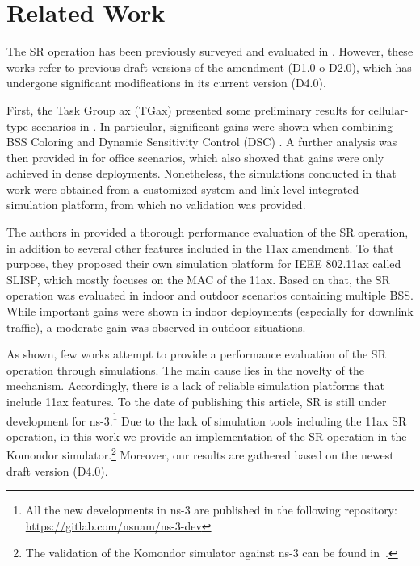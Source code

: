 \documentclass[conference]{IEEEtran}
\begin{document}
	\section{Related Work}
	\label{section:related_work}
	
	The SR operation has been previously surveyed and evaluated in \cite{bellalta2016ieee,khorov2018tutorial,sr_evaluation_1,sr_evaluation_3,sr_evaluation_2}. However, these works refer to previous draft versions of the amendment (D1.0 o D2.0), which has undergone significant modifications in its current version (D4.0).

	First, the Task Group ax (TGax) presented some preliminary results for cellular-type scenarios in \cite{sr_evaluation_1}. In particular, significant gains were shown when combining BSS Coloring and Dynamic Sensitivity Control (DSC) \cite{smith2017dynamic}. A further analysis was then provided in \cite{sr_evaluation_3} for office scenarios, which also showed that gains were only achieved in dense deployments. Nonetheless, the simulations conducted in that work were obtained from a customized system and link level integrated simulation platform, from which no validation was provided.
	
	The authors in \cite{sr_evaluation_2} provided a thorough performance evaluation of the SR operation, in addition to several other features included in the 11ax amendment. To that purpose, they proposed their own simulation platform for IEEE 802.11ax called SLISP, which mostly focuses on the MAC of the 11ax. Based on that, the SR operation was evaluated in indoor and outdoor scenarios containing multiple BSS. While important gains were shown in indoor deployments (especially for downlink traffic), a moderate gain was observed in outdoor situations.
	
	As shown, few works attempt to provide a performance evaluation of the SR operation through simulations. The main cause lies in the novelty of the mechanism. Accordingly, there is a lack of reliable simulation platforms that include 11ax features. To the date of publishing this article, SR is still under development for ns-3.\footnote{All the new developments in ns-3 are published in the following repository: \url{https://gitlab.com/nsnam/ns-3-dev}} Due to the lack of simulation tools including the 11ax SR operation, in this work we provide an implementation of the SR operation in the Komondor simulator.\footnote{The validation of the Komondor simulator against ns-3 can be found in~\cite{komondor}.} Moreover, our results are gathered based on the newest draft version (D4.0).
	
\end{document}
